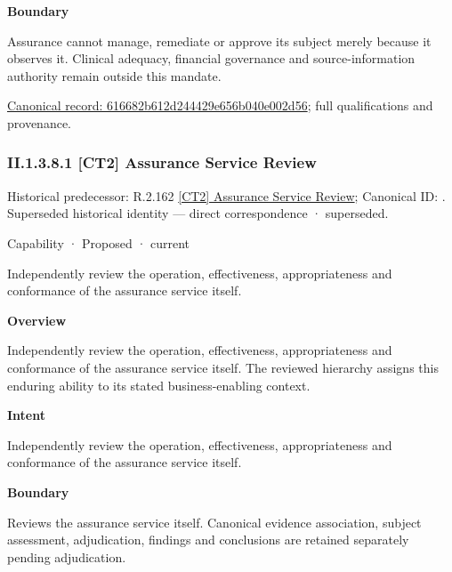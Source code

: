 \textbf{Boundary}



Assurance cannot manage, remediate or approve its subject merely because it observes it. Clinical adequacy, financial governance and source-information authority remain outside this mandate.


{\footnotesize \href{../../../../../../../continuum/strategy/capability/616682b612d244429e656b040e002d56.md}{Canonical record: 616682b612d244429e656b040e002d56}; full qualifications and provenance.}\par
\subsubsection*{II.1.3.8.1 [CT2] Assurance Service Review}
\label{navigation:II.1.3.8.1}

{\small Historical predecessor: R.2.162 \hyperref[element:b345cb12b45746409302899514126170]{[CT2] Assurance Service Review}; Canonical ID: \texttt{}. Superseded historical identity — direct correspondence · superseded.}\par
\label{element:b1a791458d644d4794895e4fa42ec83c}
{\small Capability · Proposed · current}\par

Independently review the operation, effectiveness, appropriateness and conformance of the assurance service itself.



\textbf{Overview}



Independently review the operation, effectiveness, appropriateness and conformance of the assurance service itself. The reviewed hierarchy assigns this enduring ability to its stated business-enabling context.



\textbf{Intent}



Independently review the operation, effectiveness, appropriateness and conformance of the assurance service itself.



\textbf{Boundary}



Reviews the assurance service itself. Canonical evidence association, subject assessment, adjudication, findings and conclusions are retained separately pending adjudication.


